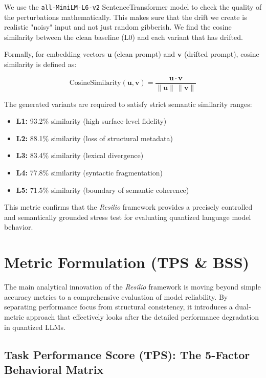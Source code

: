 \documentclass[conference]{IEEEtran}
\begin{document}
We use the \texttt{all-MiniLM-L6-v2} SentenceTransformer model to check the quality of the perturbations mathematically. This makes sure that the drift we create is realistic "noisy" input and not just random gibberish. We find the cosine similarity between the clean baseline (L0) and each variant that has drifted.

Formally, for embedding vectors $\mathbf{u}$ (clean prompt) and $\mathbf{v}$ (drifted prompt), cosine similarity is defined as:

\begin{equation}
\text{CosineSimilarity}(\mathbf{u}, \mathbf{v}) =
\frac{\mathbf{u} \cdot \mathbf{v}}{\|\mathbf{u}\| \, \|\mathbf{v}\|}
\end{equation}

The generated variants are required to satisfy strict semantic similarity ranges:

\begin{itemize}
\item \textbf{L1:} 93.2\% similarity (high surface-level fidelity)
\item \textbf{L2:} 88.1\% similarity (loss of structural metadata)
\item \textbf{L3:} 83.4\% similarity (lexical divergence)
\item \textbf{L4:} 77.8\% similarity (syntactic fragmentation)
\item \textbf{L5:} 71.5\% similarity (boundary of semantic coherence)
\end{itemize}

This metric confirms that the \textit{Resilio} framework provides a precisely controlled and semantically grounded stress test for evaluating quantized language model behavior.

\section{Metric Formulation (TPS \& BSS)}

The main analytical innovation of the \textit{Resilio} framework is moving beyond simple accuracy metrics to a comprehensive evaluation of model reliability. By separating performance focus from structural consistency, it introduces a dual-metric approach that effectively looks after the detailed performance degradation in quantized LLMs.

\subsection{Task Performance Score (TPS): The 5-Factor Behavioral Matrix}
\end{document}
